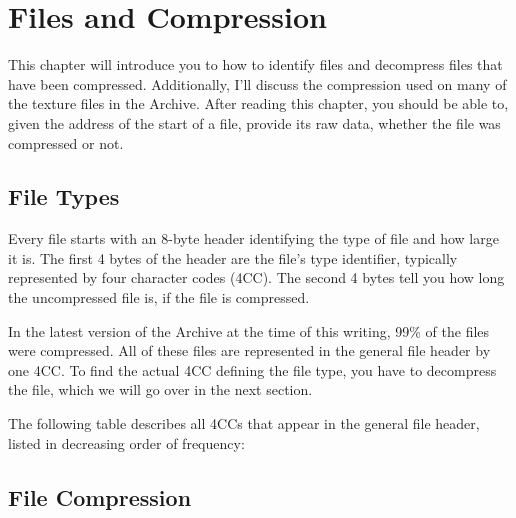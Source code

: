 \chapter{Files and Compression}
\label{chap:filesandcompression}

This chapter will introduce you to how to identify files and decompress files
that have been compressed.  Additionally, I'll discuss the compression used on
many of the texture files in the Archive.  After reading this chapter, you
should be able to, given the address of the start of a file, provide its raw
data, whether the file was compressed or not.

\section{File Types}
\label{sec:filetypes}

Every file starts with an 8-byte header identifying the type of file and how
large it is.  The first 4 bytes of the header are the file's type identifier,
typically represented by four character codes (4CC).  The second 4 bytes tell
you how long the uncompressed file is, if the file is compressed.

In the latest version of the Archive at the time of this writing, 99\% of the
files were compressed.  All of these files are represented in the general file
header by one 4CC.  To find the actual 4CC defining the file type, you have to
decompress the file, which we will go over in the next section.

The following table describes all 4CCs that appear in the general file header,
listed in decreasing order of frequency:
\\

\begin{valuetable}
\end{valuetable}


\section{File Compression}
\label{sec:filecompression}

